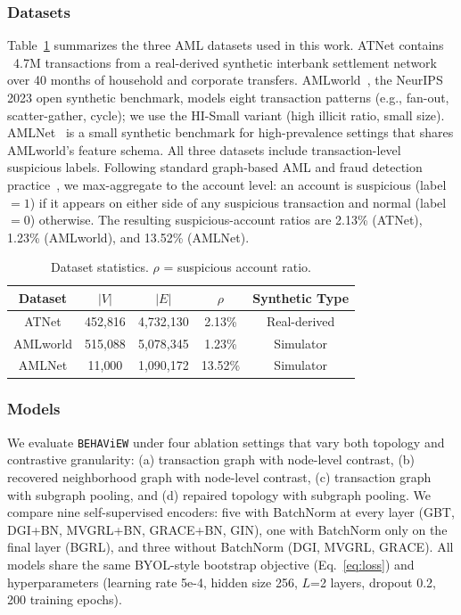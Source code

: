 \documentclass[sigconf,natbib=true,anonymous=true]{acmart}
\theoremstyle{definition}
\newcommand{\method}{\texttt{BEHAViEW}\xspace}
\newcommand{\hofinet}{ATNet\xspace} %
\begin{document}
\subsubsection{Datasets}
Table~\ref{tab:datasets} summarizes the three AML datasets used in this work. \hofinet contains ~4.7M transactions from a real-derived synthetic interbank settlement network over 40 months of household and corporate transfers. AMLworld~\cite{amlpatterns2024realistic}, the NeurIPS 2023 open synthetic benchmark, models eight transaction patterns (e.g., fan-out, scatter-gather, cycle); we use the HI-Small variant (high illicit ratio, small size). AMLNet~\cite{huda2025amlnet} is a small synthetic benchmark for high-prevalence settings that shares AMLworld’s feature schema. All three datasets include transaction-level suspicious labels. Following standard graph-based AML and fraud detection practice~\cite{dou2020enhancing,liu2021pick}, we max-aggregate to the account level: an account is suspicious (label$=1$) if it appears on either side of any suspicious transaction and normal (label$=0$) otherwise. The resulting suspicious-account ratios are 2.13\% (\hofinet), 1.23\% (AMLworld), and 13.52\% (AMLNet).

\begin{table}[t]
\centering
\caption{Dataset statistics. $\rho$ = suspicious account ratio.}
\label{tab:datasets}
\small
\begin{tabular}{ccccc}
\toprule
\textbf{Dataset} & $|V|$ & $|E|$ & $\rho$ & \textbf{Synthetic Type} \\
\midrule
\hofinet           & 452{,}816 & 4{,}732{,}130 & 2.13\% & Real-derived \\
AMLworld          & 515{,}088 & 5{,}078{,}345 & 1.23\% & Simulator \\
AMLNet            &  11{,}000 & 1{,}090{,}172 & 13.52\% & Simulator \\
\bottomrule
\end{tabular}
\end{table}

\subsubsection{Models} We evaluate \method under four ablation settings that vary both topology and contrastive granularity: (a) transaction graph with node-level contrast, (b) recovered neighborhood graph with node-level contrast, (c) transaction graph with subgraph pooling, and (d) repaired topology with subgraph pooling. We compare nine self-supervised encoders: five with BatchNorm at every layer (GBT, DGI+BN, MVGRL+BN, GRACE+BN, GIN), one with BatchNorm only on the final layer (BGRL), and three without BatchNorm (DGI, MVGRL, GRACE). All models share the same BYOL-style bootstrap objective (Eq.~\eqref{eq:loss}) and hyperparameters (learning rate 5e-4, hidden size 256, $L$=2 layers, dropout 0.2, 200 training epochs). 
\end{document}
